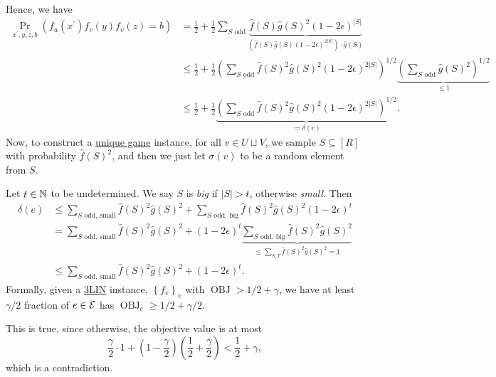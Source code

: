 Hence, we have
\[
	\begin{split}
		\Pr_{x^\prime, y, z, b}(f_u(x^\prime ) f_v(y) f_v(z) = b)
		&= \frac{1}{2} + \frac{1}{2} \sum_{\text{\(S\) odd}} \underbrace{\hat{f} (S) \hat{g} (S)^{2} (1-2\epsilon ) ^{\vert S \vert }}_{(\hat{f} (S)\hat{g} (S) (1-2\epsilon )^{2 \vert S \vert })\cdot \hat{g} (S)}\\
		&\leq \frac{1}{2} + \frac{1}{2} \left( \sum_{\text{\(S\) odd}} \hat{f} (S)^2 \hat{g} (S)^2 (1-2\epsilon )^{2 \vert S \vert } \right)^{1/2} \underbrace{\left( \sum_{\text{\(S\) odd}} \hat{g} (S)^2 \right) ^{1 / 2}}_{\leq 1}\\
		&\leq \frac{1}{2} + \frac{1}{2} \underbrace{\left( \sum_{\text{\(S\) odd}} \hat{f} (S)^2 \hat{g} (S)^2 (1-2\epsilon )^{2 \vert S \vert } \right) ^{1 / 2}}_{\coloneqq \delta (e)}.
	\end{split}
\]
Now, to construct a \hyperref[prb:unique-game]{unique game} instance, for all \(v\in U \sqcup V\), we sample \(S \subseteq [R]\) with probability \(\hat{f} (S)^2\), and then we just let \(\sigma (v)\) to be a random element from \(S\).

\begin{intuition}

\end{intuition}

Let \(t\in \mathbb{\MakeUppercase{n}} \) to be undetermined. We say \(S\) is \emph{big} if \(\vert S \vert > t\), otherwise \emph{small}. Then
\[
	\begin{split}
		\delta (e)
		&\leq \sum_{\text{\(S\) odd, small}} \hat{f} (S)^2 \hat{g} (S)^2 + \sum_{\text{\(S\) odd, big}} \hat{f} (S)^2 \hat{g} (S)^2 (1-2\epsilon )^t\\
		&= \sum_{\text{\(S\) odd, small}} \hat{f} (S)^2 \hat{g} (S)^2 + (1-2\epsilon )^t \underbrace{\sum_{\text{\(S\) odd, big}} \hat{f} (S)^2 \hat{g} (S)^2}_{\leq \sum_{S, T} \hat{f} (S)^2 \hat{g} (S)^2 = 1}\\
		&\leq \sum_{\text{\(S\) odd, small}} \hat{f} (S)^2 \hat{g} (S)^2 + (1-2\epsilon )^t.
	\end{split}
\]
Formally, given a \hyperref[prb:max-3LIN]{3LIN} instance, \(\left\{ f_v \right\} _{v}\) with \(\mathop{\mathrm{OBJ}} > 1/2 + \gamma \), we have at least \(\gamma / 2\) fraction of \(e\in \mathcal{\MakeUppercase{e}} \) has \(\mathop{\mathrm{OBJ}}_e \geq 1 / 2 + \gamma /2\).

\begin{note}
	This is true, since otherwise, the objective value is at most
	\[
		\frac{\gamma}{2}\cdot 1 + \left( 1 - \frac{\gamma}{2} \right) \left( \frac{1}{2}+ \frac{\gamma}{2} \right)  < \frac{1}{2} + \gamma ,
	\]
	which is a contradiction.
\end{note}

